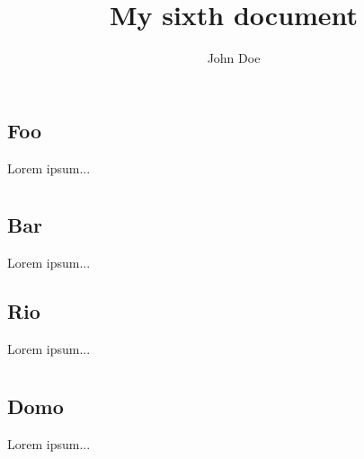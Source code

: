 \documentclass{article}
\title{My sixth document}
\author{John Doe}
\begin{document}
   \maketitle
   \section{}
   \subsection{Foo}
   Lorem ipsum...
   \section{}
   \subsection{Bar}
   Lorem ipsum...
   \subsection{Rio}
   Lorem ipsum...
   \section{}
   \subsection{Domo}
   Lorem ipsum...
\end{document}
